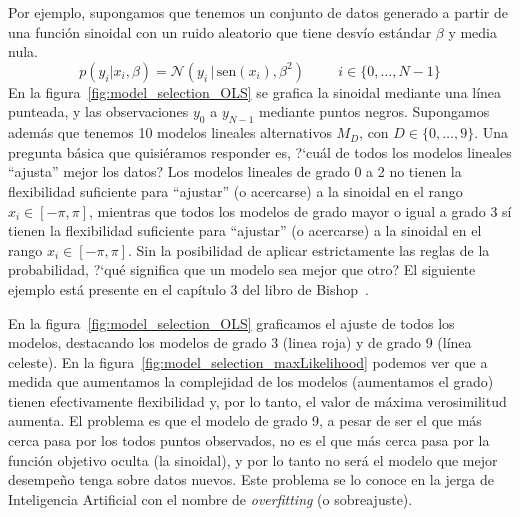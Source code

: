 \documentclass[a4paper,11pt]{book}
\newcommand{\N}{\mathcal{N}}
\theoremstyle{definition}
\begin{document}

Por ejemplo, supongamos que tenemos un conjunto de datos generado a partir de una funci\'on sinoidal con un ruido aleatorio que tiene desv\'io est\'andar $\beta$ y media nula.
%
\begin{equation*}
p(y_i|x_i,\beta) = \N(y_i \,| \, \text{sen}(x_i), \beta^2)  \hspace{1cm} \text{$i \in \{0,\dots,N-1\}$}
\end{equation*}
%
En la figura~\ref{fig:model_selection_OLS} se grafica la sinoidal mediante una l\'inea punteada, y las observaciones $y_0$ a $y_{N-1}$ mediante puntos negros.
%
Supongamos adem\'as que tenemos 10 modelos lineales alternativos $M_D$, con $D \in \{0, \dots, 9\}$.
%
Una pregunta b\'asica que quisi\'eramos responder es, ?`cu\'al de todos los modelos lineales ``ajusta'' mejor los datos?
%
Los modelos lineales de grado 0 a 2 no tienen la flexibilidad suficiente para ``ajustar'' (o acercarse) a la sinoidal en el rango $x_i \in [-\pi, \pi]$, mientras que todos los modelos de grado mayor o igual a grado 3 s\'i tienen la flexibilidad suficiente para ``ajustar'' (o acercarse) a la sinoidal en el rango $x_i \in [-\pi, \pi]$.
%
Sin la posibilidad de aplicar estrictamente las reglas de la probabilidad, ?`qu\'e significa que un modelo sea mejor que otro?
%
El siguiente ejemplo est\'a presente en el cap\'itulo 3 del libro de Bishop~\cite{Bishop2006}.

%

En la figura~\ref{fig:model_selection_OLS} graficamos el ajuste de todos los modelos, destacando los modelos de grado 3 (linea roja) y de grado 9 (l\'inea celeste).
%
En la figura~\ref{fig:model_selection_maxLikelihood} podemos ver que a medida que aumentamos la complejidad de los modelos (aumentamos el grado) tienen efectivamente flexibilidad y, por lo tanto, el valor de m\'axima verosimilitud aumenta.
%
El problema es que el modelo de grado 9, a pesar de ser el que m\'as cerca pasa por los todos puntos observados, no es el que m\'as cerca pasa por la funci\'on objetivo oculta (la sinoidal), y por lo tanto no ser\'a el modelo que mejor desempe\~no tenga sobre datos nuevos.
%
Este problema se lo conoce en la jerga de Inteligencia Artificial con el nombre de \emph{overfitting} (o sobreajuste).

\end{document}
